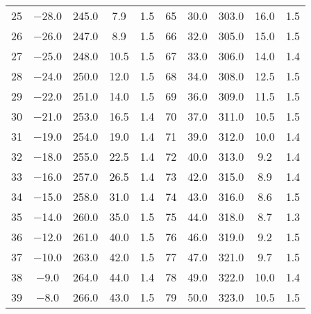 \begin{table}
\begin{tabular}{S S S S S | S S S S S}
      \num{25} &  \num{-28.0} &  \num{245.0} &  \num{ 7.9 } &  \num{1.5} & \num{65} &  \num{ 30.0} &  \num{303.0} &  \num{16.0 } &  \num{1.5} \\ 
      \num{26} &  \num{-26.0} &  \num{247.0} &  \num{ 8.9 } &  \num{1.5} & \num{66} &  \num{ 32.0} &  \num{305.0} &  \num{15.0 } &  \num{1.5} \\ 
      \num{27} &  \num{-25.0} &  \num{248.0} &  \num{10.5 } &  \num{1.5} & \num{67} &  \num{ 33.0} &  \num{306.0} &  \num{14.0 } &  \num{1.4} \\ 
      \num{28} &  \num{-24.0} &  \num{250.0} &  \num{12.0 } &  \num{1.5} & \num{68} &  \num{ 34.0} &  \num{308.0} &  \num{12.5 } &  \num{1.5} \\ 
      \num{29} &  \num{-22.0} &  \num{251.0} &  \num{14.0 } &  \num{1.5} & \num{69} &  \num{ 36.0} &  \num{309.0} &  \num{11.5 } &  \num{1.5} \\ 
      \num{30} &  \num{-21.0} &  \num{253.0} &  \num{16.5 } &  \num{1.4} & \num{70} &  \num{ 37.0} &  \num{311.0} &  \num{10.5 } &  \num{1.5} \\ 
      \num{31} &  \num{-19.0} &  \num{254.0} &  \num{19.0 } &  \num{1.4} & \num{71} &  \num{ 39.0} &  \num{312.0} &  \num{10.0 } &  \num{1.4} \\ 
      \num{32} &  \num{-18.0} &  \num{255.0} &  \num{22.5 } &  \num{1.4} & \num{72} &  \num{ 40.0} &  \num{313.0} &  \num{ 9.2 } &  \num{1.4} \\ 
      \num{33} &  \num{-16.0} &  \num{257.0} &  \num{26.5 } &  \num{1.4} & \num{73} &  \num{ 42.0} &  \num{315.0} &  \num{ 8.9 } &  \num{1.4} \\ 
      \num{34} &  \num{-15.0} &  \num{258.0} &  \num{31.0 } &  \num{1.4} & \num{74} &  \num{ 43.0} &  \num{316.0} &  \num{ 8.6 } &  \num{1.5} \\ 
      \num{35} &  \num{-14.0} &  \num{260.0} &  \num{35.0 } &  \num{1.5} & \num{75} &  \num{ 44.0} &  \num{318.0} &  \num{ 8.7 } &  \num{1.3} \\ 
      \num{36} &  \num{-12.0} &  \num{261.0} &  \num{40.0 } &  \num{1.5} & \num{76} &  \num{ 46.0} &  \num{319.0} &  \num{ 9.2 } &  \num{1.5} \\ 
      \num{37} &  \num{-10.0} &  \num{263.0} &  \num{42.0 } &  \num{1.5} & \num{77} &  \num{ 47.0} &  \num{321.0} &  \num{ 9.7 } &  \num{1.5} \\ 
      \num{38} &  \num{ -9.0} &  \num{264.0} &  \num{44.0 } &  \num{1.4} & \num{78} &  \num{ 49.0} &  \num{322.0} &  \num{10.0 } &  \num{1.4} \\ 
      \num{39} &  \num{ -8.0} &  \num{266.0} &  \num{43.0 } &  \num{1.5} & \num{79} &  \num{ 50.0} &  \num{323.0} &  \num{10.5 } &  \num{1.5} \\ 
      \bottomrule
    \end{tabular}
  \end{table}


